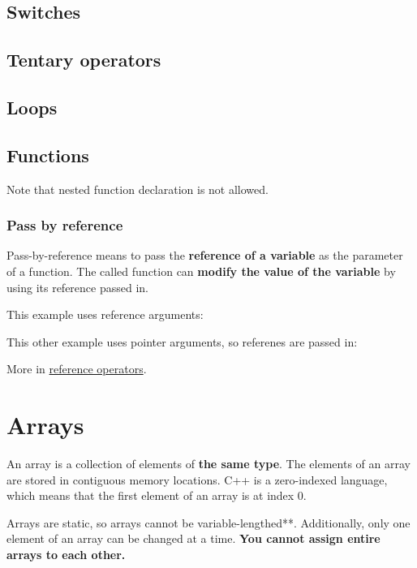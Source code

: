 \documentclass{article}
\begin{document}
\subsection{Switches}

\subsection{Tentary operators}

\subsection{Loops}


\subsection{Functions}

Note that nested function declaration is not allowed.

\subsubsection{Pass by reference}
Pass-by-reference means to pass the \textbf{reference of a variable} as the parameter of a function. The called function can \textbf{modify the value of the variable} by using its reference passed in.

This example uses reference arguments:

This other example uses pointer arguments, so referenes are passed in:

More in \hyperref[sec:pointers]{reference operators}.

\label{sec:array}
\section{Arrays}
An array is a collection of elements of \textbf{the same type}. The elements of an array are stored in contiguous memory locations. C++ is a zero-indexed language, which means that the first element of an array is at index 0.

Arrays are static, so arrays cannot be variable-lengthed**. Additionally, only one element of an array can be changed at a time. \textbf{You cannot assign entire arrays to each other.}
\end{document}
